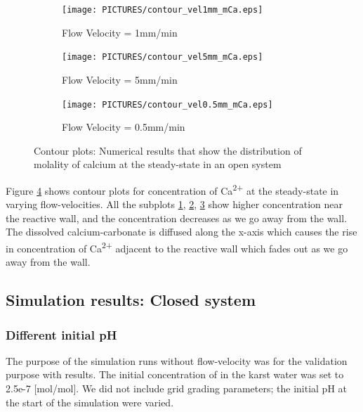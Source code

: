 \begin{figure}[!h]
\centering
    \begin{subfigure}{.5\linewidth}
        \centering
        \texttt{[image: PICTURES/contour\_vel1mm\_mCa.eps]}
        \caption{Flow Velocity = 1mm/min}
        \label{fig:CaSteady-state}       %
    \end{subfigure}%
    \hfill
    \begin{subfigure}{.5\linewidth}
        \centering
        \texttt{[image: PICTURES/contour\_vel5mm\_mCa.eps]}
        \caption{Flow Velocity = 5mm/min}
        \label{fig:CaSteady-state5mm}       %
    \end{subfigure}%
    \hfill
    \begin{subfigure}{.5\linewidth}
        \centering
        \texttt{[image: PICTURES/contour\_vel0.5mm\_mCa.eps]}
        \caption{Flow Velocity = 0.5mm/min}
        \label{fig:CaSteady-state0.5mm}       %
    \end{subfigure}%
    \caption{\DuMuX Contour plots: Numerical results that show the distribution of molality of calcium at the steady-state in an open system}
     \label{fig:contourCa}
\end{figure}

Figure \ref{fig:contourCa} shows contour plots for concentration of Ca\textsuperscript{2+} at the steady-state in varying flow-velocities. All the subplots \ref{fig:CaSteady-state}, \ref{fig:CaSteady-state5mm}, \ref{fig:CaSteady-state0.5mm} show higher concentration near the reactive wall, and the concentration decreases as we go away from the wall. The dissolved calcium-carbonate is diffused along the x-axis which causes the rise in concentration of Ca\textsuperscript{2+} adjacent to the reactive wall which fades out as we go away from the wall.


\subsection{\DuMuX Simulation results: Closed system}
\subsubsection*{Different initial pH} \label{ssec:diffinitialpHnoflow}
The purpose of the simulation runs without flow-velocity was for the validation purpose with \MATLAB results. The initial concentration of  in the karst water was set to 2.5e-7 [mol/mol]. We did not include grid grading parameters; the initial pH at the start of the simulation were varied.

